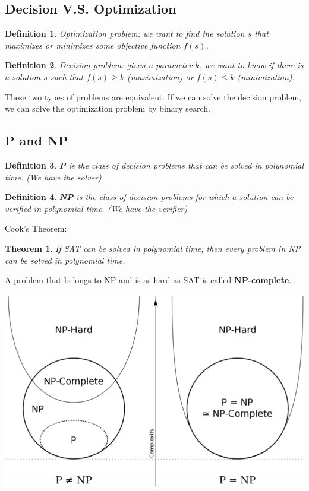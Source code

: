 \documentclass[11pt,fleqn]{article}
\newtheorem*{theorem}{Theorem}
\newtheorem*{definition}{Definition}
\begin{document}
\subsection{Decision V.S. Optimization}
\begin{definition}
    Optimization problem: we want to find the solution $s$ that maximizes or minimizes some objective function $f(s)$.
\end{definition}
\begin{definition}
    Decision problem: given a parameter $k$, we want to know if there is a solution $s$ such that $f(s) \geq k$ (maximization) or $f(s) \leq k$ (minimization).
\end{definition}
These two types of problems are equivalent. If we can solve the decision problem, we can solve the optimization problem by binary search.
\subsection{P and NP}
\begin{definition}
    \textbf{P} is the class of decision problems that can be solved in polynomial time. (We have the solver)
\end{definition}
\begin{definition}
    \textbf{NP} is the class of decision problems for which a solution can be verified in polynomial time. (We have the verifier)
\end{definition}

Cook's Theorem: \begin{theorem}
    If SAT can be solved in polynomial time, then every problem in NP can be solved in polynomial time.
\end{theorem}

A problem that belongs to NP and is as hard as SAT is called \textbf{NP-complete}.

\includegraphics*[scale = 0.5]{./Images/NP-Complete.png}
\end{document}
